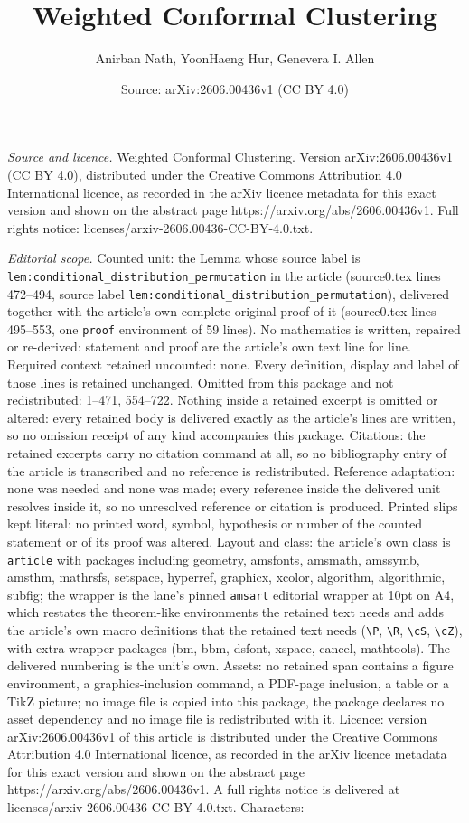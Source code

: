 \documentclass[10pt,a4paper]{amsart}
\title[Weighted Conformal Clustering]{Weighted Conformal Clustering}
\author{Anirban Nath, YoonHaeng Hur, Genevera I. Allen}
\date{Source: arXiv:2606.00436v1 (CC BY 4.0)}
\begin{document}
\maketitle

\noindent\emph{Source and licence.} Weighted Conformal Clustering. Version arXiv:2606.00436v1 (CC BY 4.0), distributed under the Creative Commons Attribution 4.0 International licence, as recorded in the arXiv licence metadata for this exact version and shown on the abstract page https://arxiv.org/abs/2606.00436v1. Full rights notice: licenses/arxiv-2606.00436-CC-BY-4.0.txt.\par\smallskip

\noindent\textit{Editorial scope.} Counted unit: the Lemma whose source label is \texttt{lem:conditional\_distribution\_permutation} in the article (source0.tex lines 472--494, source label \texttt{lem:conditional\_distribution\_permutation}), delivered together with the article's own complete original proof of it (source0.tex lines 495--553, one \texttt{proof} environment of 59 lines). No mathematics is written, repaired or re-derived: statement and proof are the article's own text line for line. Required context retained uncounted: none. Every definition, display and label of those lines is retained unchanged. Omitted from this package and not redistributed: 1--471, 554--722. Nothing inside a retained excerpt is omitted or altered: every retained body is delivered exactly as the article's lines are written, so no omission receipt of any kind accompanies this package. Citations: the retained excerpts carry no citation command at all, so no bibliography entry of the article is transcribed and no reference is redistributed. Reference adaptation: none was needed and none was made; every reference inside the delivered unit resolves inside it, so no unresolved reference or citation is produced. Printed slips kept literal: no printed word, symbol, hypothesis or number of the counted statement or of its proof was altered. Layout and class: the article's own class is \texttt{article} with packages including geometry, amsfonts, amsmath, amssymb, amsthm, mathrsfs, setspace, hyperref, graphicx, xcolor, algorithm, algorithmic, subfig; the wrapper is the lane's pinned \texttt{amsart} editorial wrapper at 10pt on A4, which restates the theorem-like environments the retained text needs and adds the article's own macro definitions that the retained text needs (\texttt{\textbackslash P}, \texttt{\textbackslash R}, \texttt{\textbackslash cS}, \texttt{\textbackslash cZ}), with extra wrapper packages (bm, bbm, dsfont, xspace, cancel, mathtools). The delivered numbering is the unit's own. Assets: no retained span contains a figure environment, a graphics-inclusion command, a PDF-page inclusion, a table or a TikZ picture; no image file is copied into this package, the package declares no asset dependency and no image file is redistributed with it. Licence: version arXiv:2606.00436v1 of this article is distributed under the Creative Commons Attribution 4.0 International licence, as recorded in the arXiv licence metadata for this exact version and shown on the abstract page https://arxiv.org/abs/2606.00436v1. A full rights notice is delivered at licenses/arxiv-2606.00436-CC-BY-4.0.txt. Characters: 
\end{document}
